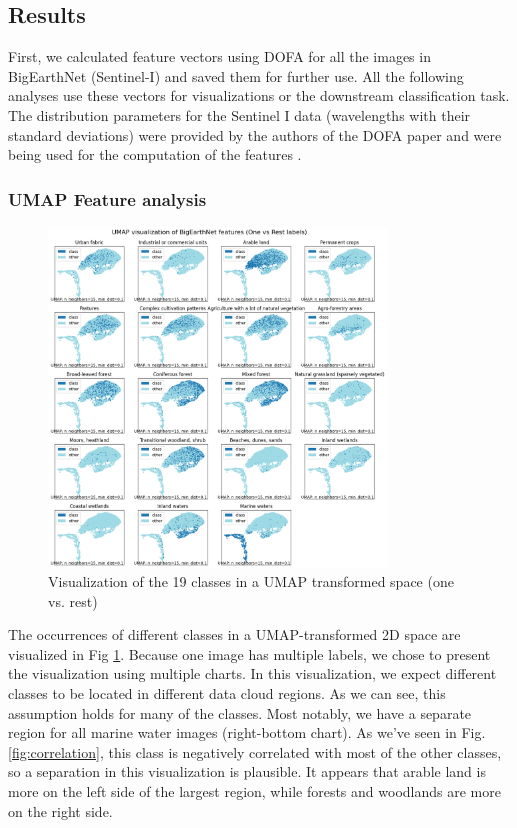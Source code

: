 \subsection{Results}

First, we calculated feature vectors using DOFA for all the images in BigEarthNet (Sentinel-I) and saved them for further use. All the following analyses use these vectors for visualizations or the downstream classification task. The distribution parameters for the Sentinel I data (wavelengths with their standard deviations) were provided by the authors of the DOFA paper and were being used for the computation of the features \cite{dofa}. 

\subsubsection{UMAP Feature analysis}

\begin{figure}[h]
  \centering
  \includegraphics[width=0.8\textwidth]{images/umap.png}
  \caption{Visualization of the 19 classes in a UMAP transformed space (one vs. rest)}
  \label{fig:umap}
\end{figure}

The occurrences of different classes in a UMAP-transformed 2D space are visualized in Fig \ref{fig:umap}. Because one image has multiple labels, we chose to present the visualization using multiple charts. In this visualization, we expect different classes to be located in different data cloud regions. As we can see, this assumption holds for many of the classes. Most notably, we have a separate region for all marine water images (right-bottom chart). As we've seen in Fig. \ref{fig:correlation}, this class is negatively correlated with most of the other classes, so a separation in this visualization is plausible. It appears that arable land is more on the left side of the largest region, while forests and woodlands are more on the right side.

